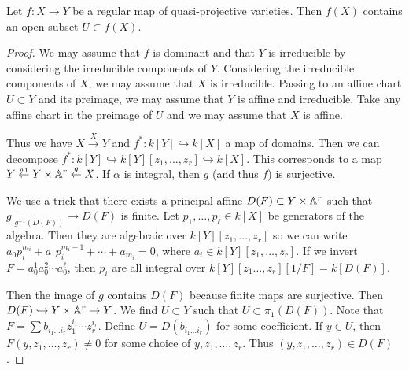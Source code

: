 \documentclass[twoside, 10pt]{article}
\begin{document}
    \begin{thm} Let $f: X \to Y$ be a regular map of quasi-projective
        varieties. Then $f(X)$ contains an open subset $U \subset
        \overline{f(X)}$.  \begin{proof} We may assume that $f$ is dominant and
            that $Y$ is irreducible by considering the irreducible components
            of $Y$. Considering the irreducible components of $X$, we may
            assume that $X$ is irreducible. Passing to an affine chart $U
            \subset Y$ and its preimage, we may assume that $Y$ is affine and
            irreducible. Take any affine chart in the preimage of $U$ and we
            may assume that $X$ is affine. 
            
            Thus we have $X \overset{X}{\to} Y$ and $f^*: k[Y] \hookrightarrow
            k[X]$ a map of domains. Then we can decompose $f^*:k[Y]
            \hookrightarrow k[Y][z_1, \ldots, z_r] \hookrightarrow k[X]$. This
            corresponds to a map $Y \overset{\pi_1}{\gets} Y \times \mathbb{A}^r
            \overset{g}{\gets} X$. If $\alpha$ is integral, then $g$ (and thus
            $f$) is surjective. 
            
            We use a trick that there exists a principal affine $D(F) \subset Y
            \times \mathbb{A}^r$ such that $g\vert_{g^{-1}(D(F))} \to D(F)$ is finite.
            Let $p_1, \ldots, p_{\ell} \in k[X]$ be generators of the algebra.
            Then they are algebraic over $k[Y][z_1, \ldots, z_r]$ so we can
            write $a_0p_i^{m_i} + a_1p_i^{m_i-1} + \cdots + a_{m_i} = 0$, where
            $a_i \in k[Y][z_1, \ldots, z_r]$. If we invert $F =
            a_0^1a_0^2\cdots a_0^{\ell}$, then $p_i$ are all integral over
            $k[Y][z_1 \ldots, z_r][1/F] = k[D(F)]$.

            Then the image of $g$ contains $D(F)$ because finite maps are
            surjective. Then $D(F) \hookrightarrow Y \times \mathbb{A}^r \to Y$. We
            find $U \subset Y$ such that $U \subset \pi_1(D(F))$. Note that $F
            = \sum b_{i_1 \ldots i_r} z_1^{i_1} \cdots z_r^{i_r}$. Define $U =
            D(b_{i_1 \ldots i_r})$ for some coefficient. If $y \in U$, then
            $F(y, z_1, \ldots, z_r) \neq 0$ for some choice of $y, z_1, \ldots,
            z_r$. Thus $(y, z_1, \ldots, z_r) \in D(F)$.  \end{proof} \end{thm}
\end{document}

